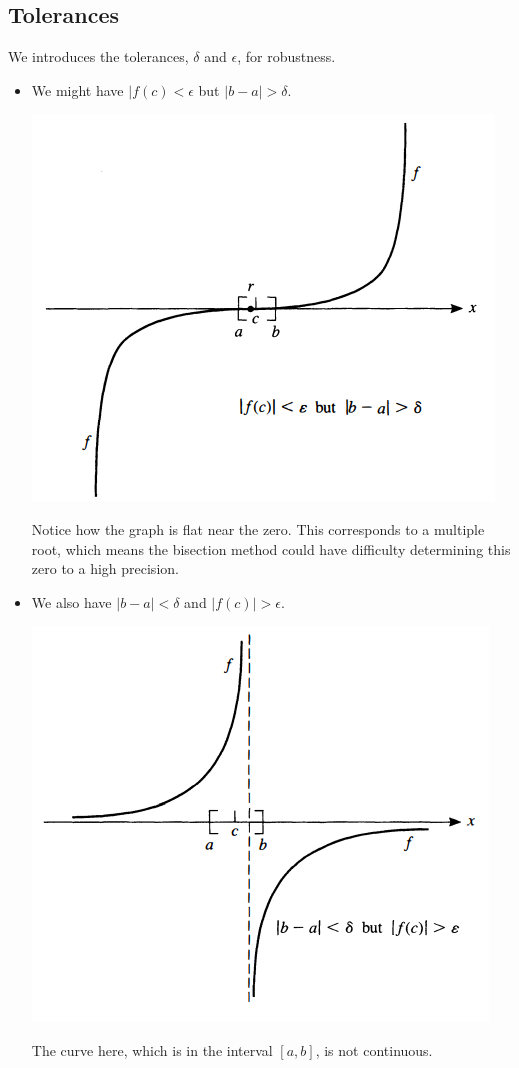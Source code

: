 \documentclass[letterpaper]{article}
\begin{document}
\subsection{Tolerances}
We introduces the tolerances, $\delta$ and $\epsilon$, for robustness. 
\begin{itemize}
    \item We might have $|f(c) < \epsilon$ but $|b - a| > \delta$. 
    \begin{center}
        \includegraphics[scale=0.8]{../assets/case1.png}
    \end{center}
    Notice how the graph is flat near the zero. This corresponds to a multiple root, which means the bisection method could have difficulty determining this zero to a high precision.
    \item We also have $|b - a| < \delta$ and $|f(c)| > \epsilon$.
    \begin{center}
        \includegraphics[scale=0.8]{../assets/case2.png}
    \end{center}
    The curve here, which is in the interval $[a, b]$, is not continuous.
\end{itemize}
\end{document}
